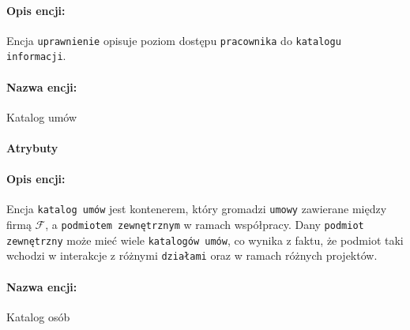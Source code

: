 \documentclass{article}
\begin{document}
\paragraph{Opis encji: \\}
Encja \texttt{uprawnienie} opisuje poziom dostępu \texttt{pracownika} do \texttt{katalogu informacji}. 
\paragraph{Nazwa encji:\\ }
Katalog umów
\paragraph{Atrybuty\\ }
\begin{table}[H]

\caption{Tabela z opisem encji.} 
\end{table}
\paragraph{Opis encji: \\}
Encja \texttt{katalog umów} jest kontenerem, który gromadzi \texttt{umowy} zawierane między firmą $\mathcal{F}$, a 
\texttt{podmiotem zewnętrznym} w ramach współpracy. Dany \texttt{podmiot zewnętrzny} może mieć wiele \texttt{katalogów umów}, co wynika z faktu, że podmiot taki wchodzi w interakcje z różnymi \texttt{działami} oraz w ramach różnych projektów.
\paragraph{Nazwa encji:\\ }
Katalog osób
\end{document}
